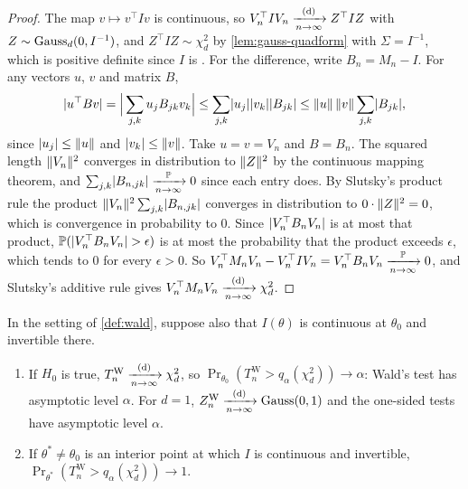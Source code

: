 \begin{proof}
The map $v \mapsto v^\top I v$ is continuous, so $V_n^\top I V_n \xrightarrow [n \to \infty ]{\text{(d)}} Z^\top I Z$ with $Z \sim \text{Gauss}_d(0, I^{-1})$, and $Z^\top I Z \sim \chi^2_d$ by \cref{lem:gauss-quadform} with $\Sigma = I^{-1}$, which is positive definite since $I$ is .
For the difference, write $B_n = M_n - I$.
For any vectors $u$, $v$ and matrix $B$,
\begin{equation}
\label{eq:wlr-bound}
\lvert u^\top B v\rvert = \Big|\sum_{j,k} u_j B_{jk} v_k\Big| \leq \sum_{j,k}\lvert u_j\rvert\lvert v_k\rvert\lvert B_{jk}\rvert \leq \lVert u\rVert\,\lVert v\rVert \sum_{j,k}\lvert B_{jk}\rvert,
\end{equation}
since $\lvert u_j\rvert \leq \lVert u\rVert$ and $\lvert v_k\rvert \leq \lVert v\rVert$.
Take $u = v = V_n$ and $B = B_n$.
The squared length $\lVert V_n\rVert^2$ converges in distribution to $\lVert Z\rVert^2$ by the continuous mapping theorem, and $\sum_{j,k}\lvert B_{n,jk}\rvert \xrightarrow [n \to \infty ]{\mathbb{P}} 0$ since each entry does.
By Slutsky's product rule the product $\lVert V_n\rVert^2\sum_{j,k}\lvert B_{n,jk}\rvert$ converges in distribution to $0 \cdot \lVert Z\rVert^2 = 0$, which is convergence in probability to $0$.
Since $\lvert V_n^\top B_n V_n\rvert$ is at most that product, $\mathbb{P}(\lvert V_n^\top B_n V_n\rvert > \epsilon)$ is at most the probability that the product exceeds $\epsilon$, which tends to $0$ for every $\epsilon > 0$.
So $V_n^\top M_n V_n - V_n^\top I V_n = V_n^\top B_n V_n \xrightarrow [n \to \infty ]{\mathbb{P}} 0$, and Slutsky's additive rule gives $V_n^\top M_n V_n \xrightarrow [n \to \infty ]{\text{(d)}} \chi^2_d$.
\end{proof}

\begin{theorem}
\label{thm:wald}
In the setting of \cref{def:wald}, suppose also that $I(\theta)$ is continuous at $\theta_0$ and invertible there.
\begin{enumerate}[nosep]
\item If $H_0$ is true, $T^{\mathrm{W}}_n \xrightarrow [n \to \infty ]{\text{(d)}} \chi^2_d$, so $\Pr_{\theta_0}(T^{\mathrm{W}}_n > q_\alpha(\chi^2_d)) \to \alpha$: Wald's test has asymptotic level $\alpha$. For $d = 1$, $Z^{\mathrm{W}}_n \xrightarrow [n \to \infty ]{\text{(d)}} \text{Gauss}(0, 1)$ and the one-sided tests have asymptotic level $\alpha$.
\item If $\theta^* \neq \theta_0$ is an interior point at which $I$ is continuous and invertible, $\Pr_{\theta^*}(T^{\mathrm{W}}_n > q_\alpha(\chi^2_d)) \to 1$.
\end{enumerate}
\end{theorem}

